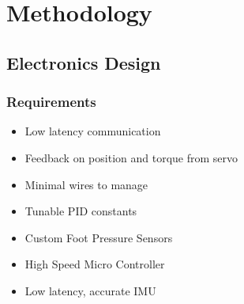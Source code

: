 \section{Methodology}
\subsection{Electronics Design}

    \subsubsection{Requirements}
        \begin{itemize} %
            \item Low latency communication
            \item Feedback on position and torque from servo
            \item Minimal wires to manage
            \item Tunable PID constants
            \item Custom Foot Pressure Sensors
            \item High Speed Micro Controller
            \item Low latency, accurate IMU
        \end{itemize}
